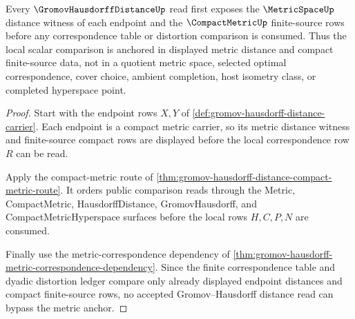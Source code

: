 \begin{theorem}
\label{thm:gromov-hausdorff-distance-metric-anchor}
Every $\GromovHausdorffDistanceUp$ read first exposes the $\MetricSpaceUp$ distance witness of each endpoint and the $\CompactMetricUp$ finite-source rows before any correspondence table or distortion comparison is consumed. Thus the local scalar comparison is anchored in displayed metric distance and compact finite-source data, not in a quotient metric space, selected optimal correspondence, cover choice, ambient completion, host isometry class, or completed hyperspace point.
\end{theorem}
\begin{proof}
Start with the endpoint rows $X,Y$ of \autoref{def:gromov-hausdorff-distance-carrier}. Each endpoint is a compact metric carrier, so its metric distance witness and finite-source compact rows are displayed before the local correspondence row $R$ can be read.

Apply the compact-metric route of \autoref{thm:gromov-hausdorff-distance-compact-metric-route}. It orders public comparison reads through the Metric, CompactMetric, HausdorffDistance, GromovHausdorff, and CompactMetricHyperspace surfaces before the local rows $H,C,P,N$ are consumed.

Finally use the metric-correspondence dependency of \autoref{thm:gromov-hausdorff-metric-correspondence-dependency}. Since the finite correspondence table and dyadic distortion ledger compare only already displayed endpoint distances and compact finite-source rows, no accepted Gromov--Hausdorff distance read can bypass the metric anchor.
\end{proof}
